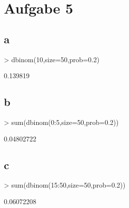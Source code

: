 

\section{Aufgabe 5}
\subsection{a}
\begin{Schunk}
\begin{Sinput}
> dbinom(10,size=50,prob=0.2)
\end{Sinput}
\begin{Soutput}
[1] 0.139819
\end{Soutput}
\end{Schunk}

\subsection{b}
\begin{Schunk}
\begin{Sinput}
> sum(dbinom(0:5,size=50,prob=0.2))
\end{Sinput}
\begin{Soutput}
[1] 0.04802722
\end{Soutput}
\end{Schunk}

\subsection{c}
\begin{Schunk}
\begin{Sinput}
> sum(dbinom(15:50,size=50,prob=0.2))
\end{Sinput}
\begin{Soutput}
[1] 0.06072208
\end{Soutput}
\end{Schunk}

